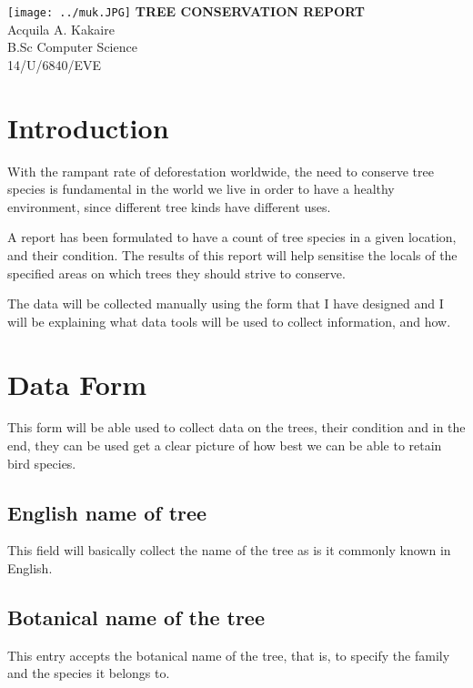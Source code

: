 \documentclass[10pt,a4paper]{article}
\begin{document}
\begin{center}
\texttt{[image: ../muk.JPG]}   \vfill
  {\Huge \textbf{TREE CONSERVATION REPORT}}
  \vspace{5cm}
  \\{\LARGE Acquila A. Kakaire}
  \vspace{1.5cm}
  \\{\Large B.Sc Computer Science}
  \vspace{1.5cm}
  \\{\Large 14/U/6840/EVE}
  \date{\today}
  \vspace{7.5cm}
		
\end{center}
\newpage

\section{Introduction}
With the rampant rate of deforestation worldwide, the need to conserve tree species is fundamental in the world we live in order to have a healthy environment, since different tree kinds have different uses.

A report has been formulated to have a count of tree species in a given location, and their condition. The results of this report will help sensitise the locals of the specified areas on which trees they should strive to conserve.

The data will be collected manually using the form that I have designed and I will be explaining what data tools will be used to collect information, and how.

\section{Data Form}
This form will be able used to collect data on the trees, their condition and in the end, they can be used get a clear picture of how  best we can be able to retain bird species.

\subsection{English name of tree}
This field will basically collect the name of the tree as is it commonly known in English.

\subsection {Botanical name of the tree}
This entry accepts the botanical name of the tree, that is, to specify the family and the species it belongs to.
\end{document}

